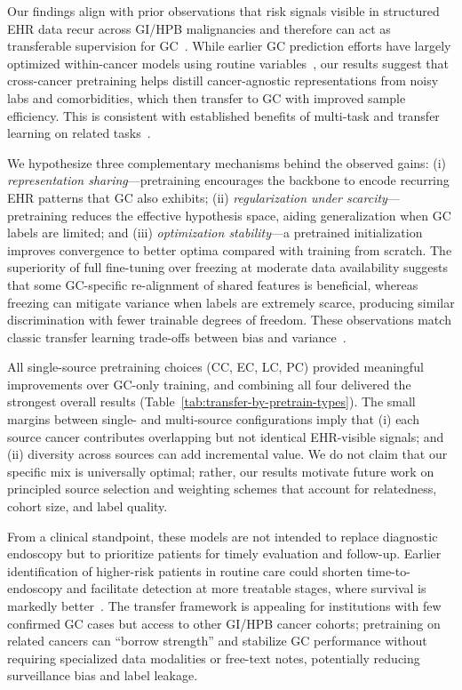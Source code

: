 \documentclass[diagnostics,article,submit,pdftex,moreauthors]{Definitions/mdpi}
\begin{document}
Our findings align with prior observations that risk signals visible in structured EHR data recur across GI/HPB malignancies and therefore can act as transferable supervision for GC~\citep{read2023cancers,Aksoy2019CBC,Krieg2024IDA,Kim2014GIBleed,Stein2016Anemia,Gkamprela2017CLDIDA,Crumley2010Albumin,Shimoyama2013DMGC,Yoon2013DMGC,Guo2022DMGC}. While earlier GC prediction efforts have largely optimized within-cancer models using routine variables~\citep{park2024SHapley,huang2022jco,Kim2024EHRGC}, our results suggest that cross-cancer pretraining helps distill cancer-agnostic representations from noisy labs and comorbidities, which then transfer to GC with improved sample efficiency. This is consistent with established benefits of multi-task and transfer learning on related tasks~\citep{Caruana1997_MTL,Pan2010_TLsurvey,Yosinski2014_transferable}.

We hypothesize three complementary mechanisms behind the observed gains:
(i) \textit{representation sharing}—pretraining encourages the backbone to encode recurring EHR patterns that GC also exhibits;
(ii) \textit{regularization under scarcity}—pretraining reduces the effective hypothesis space, aiding generalization when GC labels are limited;
and (iii) \textit{optimization stability}—a pretrained initialization improves convergence to better optima compared with training from scratch. The superiority of full fine-tuning over freezing at moderate data availability suggests that some GC-specific re-alignment of shared features is beneficial, whereas freezing can mitigate variance when labels are extremely scarce, producing similar discrimination with fewer trainable degrees of freedom. These observations match classic transfer learning trade-offs between bias and variance~\citep{Pan2010_TLsurvey,Yosinski2014_transferable}.

All single-source pretraining choices (CC, EC, LC, PC) provided meaningful improvements over GC-only training, and combining all four delivered the strongest overall results (Table~\ref{tab:transfer-by-pretrain-types}). The small margins between single- and multi-source configurations imply that (i) each source cancer contributes overlapping but not identical EHR-visible signals; and (ii) diversity across sources can add incremental value. We do not claim that our specific mix is universally optimal; rather, our results motivate future work on principled source selection and weighting schemes that account for relatedness, cohort size, and label quality.

From a clinical standpoint, these models are not intended to replace diagnostic endoscopy but to prioritize patients for timely evaluation and follow-up. Earlier identification of higher-risk patients in routine care could shorten time-to-endoscopy and facilitate detection at more treatable stages, where survival is markedly better~\citep{NCI2023stomach}. The transfer framework is appealing for institutions with few confirmed GC cases but access to other GI/HPB cancer cohorts; pretraining on related cancers can “borrow strength” and stabilize GC performance without requiring specialized data modalities or free-text notes, potentially reducing surveillance bias and label leakage.
\end{document}

